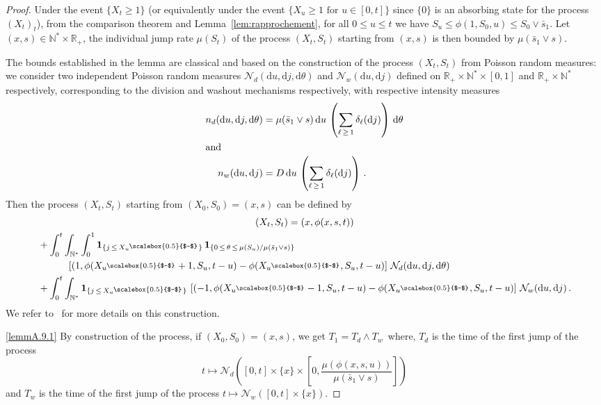 \documentclass[10pt]{amsart}
\theoremstyle{definition}\newtheorem{defi}[theo]{Definition}\newtheorem{rema}[theo]{Remark}\newtheorem{exam}[theo]{Example}\newtheorem{exem}[theo]{Example}\newtheorem{nota}[theo]{Notation}
\newcommand{\RR}{\mathbb{R}}
\newcommand{\NN}{\mathbb{N}}
\newcommand{\clN}{\mathcal{N}}
\newcommand{\umoins}{{\smash{u^{\raisebox{-1pt}{\scriptsize\scalebox{0.5}{$-$}}}}}}
\newcommand{\dif}{\mathrm{d}}
\newcommand{\1}{\mathbf{1}}
\begin{document}
\begin{proof}
Under the event $\{X_t\geq 1\}$ (or equivalently under the event $\{X_u\geq 1 \text{ for } u \in [0, t]\}$ since $\{0\}$ is an absorbing state for the process $(X_t)_t$), from the comparison theorem and Lemma~\ref{lem:rapprochement}, for all $0\leq u \leq t$ we have $S_u \leq \phi(1,S_0,u)\leq S_0\vee \bar s_1$. Let $(x,s) \in \NN^*\times \RR_+$, the individual jump rate $\mu(S_t)$ of the process $(X_t,S_t)$ starting from $(x,s)$ is then bounded by $\mu(\bar s_1\vee s)$.


The bounds established in the lemma are classical and based on the construction of the process $(X_t,S_t)$ from Poisson random measures: we consider two independent Poisson random measures $\clN _d(\dif u, \dif j, \dif \theta)$ and $\clN _w(\dif u, \dif j)$ defined on $\RR_+ \times \NN^* \times [0,1]$ and $\RR_+ \times \NN^*$ respectively, corresponding to the division and washout mechanisms respectively, with respective intensity measures
\begin{align*}
n_d(\dif u, \dif j, \dif \theta) &=
\mu(\bar s_1 \vee s) \, \dif u \, \left(\sum_{\ell\,\geq\,1} \delta_{\ell}(\dif j) \right)
\, \dif \theta\\
\intertext{and}
n_w(\dif u, \dif j) &= D \, \dif u \, \left(\sum_{\ell\,\geq\,1} \delta_{\ell}(\dif j) \right)\,.
\end{align*}
Then the process $(X_t,S_t)$ starting from $(X_0,S_0)=(x,s)$ can be defined by
\begin{multline*}
(X_t,S_t) = (x, \phi(x,s,t))\\
\begin{aligned}
&+ \int_0^t \int_{\NN^*} \int_0^1 \1_{\left\{j\,\leq\,X_{\umoins}\right\}}\,\1_{\left\{0\,\leq\,\theta \,\leq\,\mu(S_u)/\mu(\bar s_1 \vee s)\right\}}\,\\
& \qquad \quad
\left[(1, \phi(X_\umoins +1, S_u, t-u)- \phi(X_\umoins, S_u, t-u)\right]\,\clN _d(\dif u, \dif j, \dif \theta)
\\
&+ \int_0^t \int_{\NN^*} \1_{\left\{j\,\leq\,X_{\umoins}\right\}}\,
\left[(-1, \phi(X_\umoins -1, S_u, t-u)- \phi(X_\umoins, S_u, t-u)\right]\,\clN _w(\dif u, \dif j)\,.
\end{aligned}
\end{multline*}
We refer to~\cite{CF15} for more details on this construction.

\eqref{lemmA.9.1} By construction of the process, if $(X_0,S_0)=(x,s)$, we get $T_1 = T_{d}\wedge T_{w}\,$ where, $T_{d}$ is the time of the first jump of the process
\[
t\mapsto \clN _{d}\left([0,t]\times \{x\}\times \left[0,\frac{\mu(\phi(x,s,u))}{\mu(\bar s_1 \vee s)}\right] \right)
\]
and $T_{w}$ is the time of the first jump of the process $t\mapsto \clN _{w}([0,t]\times \{x\})$.


\end{proof}
\end{document}
